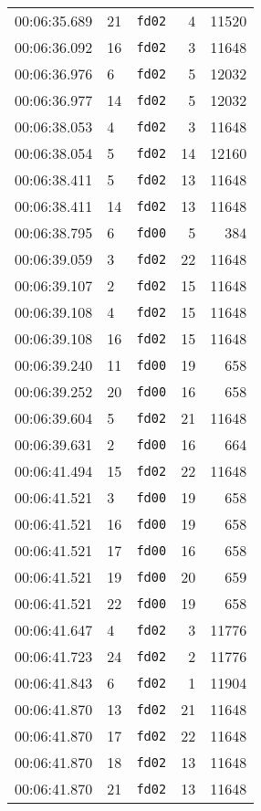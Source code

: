 \documentclass{article}
\begin{document}
\begin{longtable}{lllrr}
00:06:35.689 & 21 & \texttt{fd02} & 4 & 11520 \\
00:06:36.092 & 16 & \texttt{fd02} & 3 & 11648 \\
00:06:36.976 & 6 & \texttt{fd02} & 5 & 12032 \\
00:06:36.977 & 14 & \texttt{fd02} & 5 & 12032 \\
00:06:38.053 & 4 & \texttt{fd02} & 3 & 11648 \\
00:06:38.054 & 5 & \texttt{fd02} & 14 & 12160 \\
00:06:38.411 & 5 & \texttt{fd02} & 13 & 11648 \\
00:06:38.411 & 14 & \texttt{fd02} & 13 & 11648 \\
00:06:38.795 & 6 & \texttt{fd00} & 5 & 384 \\
00:06:39.059 & 3 & \texttt{fd02} & 22 & 11648 \\
00:06:39.107 & 2 & \texttt{fd02} & 15 & 11648 \\
00:06:39.108 & 4 & \texttt{fd02} & 15 & 11648 \\
00:06:39.108 & 16 & \texttt{fd02} & 15 & 11648 \\
00:06:39.240 & 11 & \texttt{fd00} & 19 & 658 \\
00:06:39.252 & 20 & \texttt{fd00} & 16 & 658 \\
00:06:39.604 & 5 & \texttt{fd02} & 21 & 11648 \\
00:06:39.631 & 2 & \texttt{fd00} & 16 & 664 \\
00:06:41.494 & 15 & \texttt{fd02} & 22 & 11648 \\
00:06:41.521 & 3 & \texttt{fd00} & 19 & 658 \\
00:06:41.521 & 16 & \texttt{fd00} & 19 & 658 \\
00:06:41.521 & 17 & \texttt{fd00} & 16 & 658 \\
00:06:41.521 & 19 & \texttt{fd00} & 20 & 659 \\
00:06:41.521 & 22 & \texttt{fd00} & 19 & 658 \\
00:06:41.647 & 4 & \texttt{fd02} & 3 & 11776 \\
00:06:41.723 & 24 & \texttt{fd02} & 2 & 11776 \\
00:06:41.843 & 6 & \texttt{fd02} & 1 & 11904 \\
00:06:41.870 & 13 & \texttt{fd02} & 21 & 11648 \\
00:06:41.870 & 17 & \texttt{fd02} & 22 & 11648 \\
00:06:41.870 & 18 & \texttt{fd02} & 13 & 11648 \\
00:06:41.870 & 21 & \texttt{fd02} & 13 & 11648 \\

\end{longtable}
\end{document}
